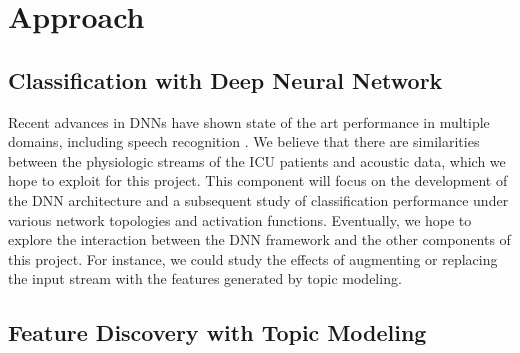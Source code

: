 \documentclass[dvips,12pt]{article}
\begin{document}
\section{Approach}

\subsection{Classification with Deep Neural Network}

Recent advances in DNNs have shown state of the art performance in multiple domains, including speech recognition \cite{hinton2012deep}. We believe that there are similarities between the physiologic streams of the ICU patients and acoustic data, which we hope to exploit for this project. This component will focus on the development of the DNN architecture and a subsequent study of classification performance under various network topologies and activation functions. 
Eventually, we hope to explore the interaction between the DNN framework and the other components of this project. 
For instance, we could study the effects of augmenting or replacing the input stream with the features generated by topic modeling.


\subsection{Feature Discovery with Topic Modeling}
\end{document}
